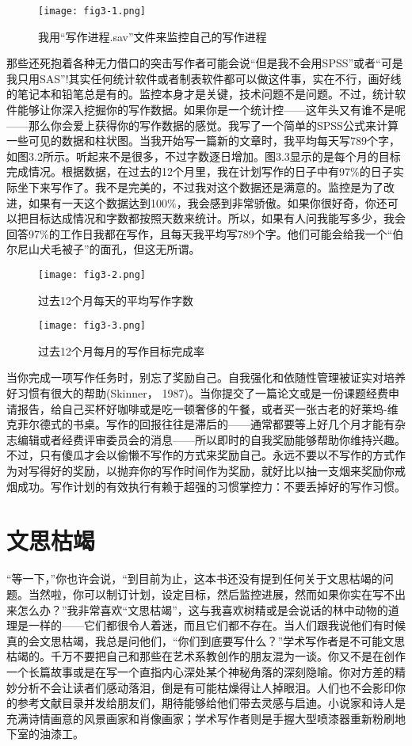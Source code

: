 \begin{figure}[!htb]
\label{fig3-1}
\centering
\texttt{[image: fig3-1.png]}
\caption{我用“写作进程.sav”文件来监控自己的写作进程}
\end{figure}

那些还死抱着各种无力借口的突击写作者可能会说“但是我不会用SPSS”或者“可是我只用SAS”!其实任何统计软件或者制表软件都可以做这件事，实在不行，画好线的笔记本和铅笔总是有的。监控本身才是关键，技术问题不是问题。不过，统计软件能够让你深入挖掘你的写作数据。如果你是一个统计控——这年头又有谁不是呢——那么你会爱上获得你的写作数据的感觉。我写了一个简单的SPSS公式来计算一些可见的数据和柱状图。当我开始写一篇新的文章时，我平均每天写789个字，如图3.2所示。听起来不是很多，不过字数逐日增加。图3.3显示的是每个月的目标完成情况。根据数据，在过去的12个月里，我在计划写作的日子中有97\%的日子实际坐下来写作了。我不是完美的，不过我对这个数据还是满意的。监控是为了改进，如果有一天这个数据达到100\%，我会感到非常骄傲。如果你很好奇，你还可以把目标达成情况和字数都按照天数来统计。所以，如果有人问我能写多少，我会回答97\%的工作日我都在写作，且每天我平均写789个字。他们可能会给我一个“伯尔尼山犬毛被子”的面孔，但这无所谓。

\begin{figure}[!htb]
\label{fig3-2}
\centering
\texttt{[image: fig3-2.png]}
\caption{过去12个月每天的平均写作字数}
\end{figure}


\begin{figure}[!htb]
\label{fig3-3}
\centering
\texttt{[image: fig3-3.png]}
\caption{过去12个月每月的写作目标完成率}
\end{figure}


当你完成一项写作任务时，别忘了奖励自己。自我强化和依随性管理被证实对培养好习惯有很大的帮助(Skinner， 1987)。当你提交了一篇论文或是一份课题经费申请报告，给自己买杯好咖啡或是吃一顿奢侈的午餐，或者买一张古老的好莱坞-维克菲尔德式的书桌。写作的回报往往是滞后的——通常都要等上好几个月才能有杂志编辑或者经费评审委员会的消息——所以即时的自我奖励能够帮助你维持兴趣。不过，只有傻瓜才会以偷懒不写作的方式来奖励自己。永远不要以不写作的方式作为对写得好的奖励，以抛弃你的写作时间作为奖励，就好比以抽一支烟来奖励你戒烟成功。写作计划的有效执行有赖于超强的习惯掌控力：不要丢掉好的写作习惯。


\section{文思枯竭}
“等一下，”你也许会说，“到目前为止，这本书还没有提到任何关于文思枯竭的问题。当然啦，你可以制订计划，设定目标，然后监控进展，然而如果你实在写不出来怎么办？”我非常喜欢“文思枯竭”，这与我喜欢树精或是会说话的林中动物的道理是一样的——它们都很令人着迷，而且它们都不存在。当人们跟我说他们有时候真的会文思枯竭，我总是问他们，“你们到底要写什么？”学术写作者是不可能文思枯竭的。千万不要把自己和那些在艺术系教创作的朋友混为一谈。你又不是在创作一个长篇故事或是在写一个直指内心深处某个神秘角落的深刻隐喻。你对方差的精妙分析不会让读者们感动落泪，倒是有可能枯燥得让人掉眼泪。人们也不会影印你的参考文献目录并发给朋友们，期待能够给他们带去灵感与启迪。小说家和诗人是充满诗情画意的风景画家和肖像画家；学术写作者则是手握大型喷漆器重新粉刷地下室的油漆工。

